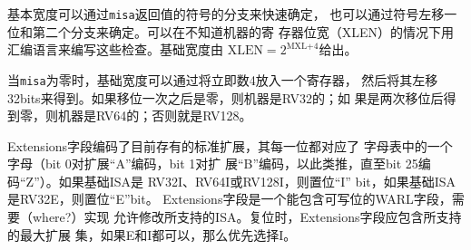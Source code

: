 \iffalse
\begin{commentary}
The base width can be quickly ascertained using branches on the sign
of the returned {\tt misa} value, and possibly a shift left by one and
a second branch on the sign.  These checks can be written in assembly
code without knowing the register width (XLEN) of the machine.  The
base width is given by $\mbox{XLEN}=2^{\mbox{MXL+4}}$.

The base width can also be found if {\tt misa} is zero, by placing the
immediate 4 in a register then shifting the register left by 31 bits
at a time.  If zero after one shift, then the machine is RV32.  If
zero after two shifts, then the machine is RV64, else RV128.
\end{commentary}
\fi

\begin{commentary}
基本宽度可以通过{\tt misa}返回值的符号的分支来快速确定，
也可以通过符号左移一位和第二个分支来确定。可以在不知道机器的寄
存器位宽（XLEN）的情况下用汇编语言来编写这些检查。基础宽度由
$\mbox{XLEN}=2^{\mbox{MXL+4}}$给出。

当{\tt misa}为零时，基础宽度可以通过将立即数4放入一个寄存器，
然后将其左移32bits来得到。如果移位一次之后是零，则机器是RV32的；如
果是两次移位后得到零，则机器是RV64的；否则就是RV128。
\end{commentary}

\iffalse
The Extensions field encodes the presence of the standard extensions,
with a single bit per letter of the alphabet (bit 0 encodes presence
of extension ``A'' , bit 1 encodes presence of extension ``B'',
through to bit 25 which encodes ``Z'').  The ``I'' bit will be set for
RV32I, RV64I, RV128I base ISAs, and the ``E'' bit will be set for
RV32E.  The Extensions field is a \warl\ field that can contain writable bits
where the implementation allows the supported ISA to be modified.  At
reset, the Extensions field shall contain the maximal set of supported
extensions, and I shall be selected over E if both are available.
\fi

Extensions字段编码了目前存有的标准扩展，其每一位都对应了
字母表中的一个字母（bit 0对扩展``A''编码，bit 1对扩
展``B''编码，以此类推，直至bit 25编码``Z''）。如果基础ISA是
RV32I、RV64I或RV128I，则置位``I'' bit，如果基础ISA是RV32E，则置位``E''bit。
Extensions字段是一个能包含可写位的WARL字段，需要（where?）实现
允许修改所支持的ISA。复位时，Extensions字段应包含所支持的最大扩展
集，如果E和I都可以，那么优先选择I。

\iffalse
When a standard extension is disabled by clearing its bit in {\tt misa}, the instructions and CSRs defined or modified by the extension revert to their defined or reserved behaviors as if the extension is not implemented.
\fi

